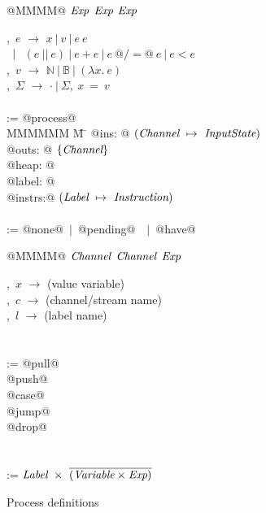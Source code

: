 
\begin{figure}
\begin{minipage}[t]{0.4\textwidth}
\begin{tabbing}
\Instr \TABDEF @MMMM@  \TABSKIP $\textit{Exp}$ \TABSKIP $\textit{Exp}$ \TABSKIP $\textit{Exp}$ \kill

\Exp,~$e$ \> $\to$ \> $x~|~v~|~e~e $ \\
  \> $\enskip|~$ \> $ (e~||~e) ~|~ e+e ~|~ e~@/=@~e ~|~ e < e$ \\
\Value,~$v$ \> $\to$ \> $\mathbb{N}~|~\mathbb{B}~|~(\lambda{}x.~e)$ \\
\Heap,~$\Sigma$ \> $\to$ \> $\cdot~|~\Sigma,~x~=~v$ \\
\\

\Proc \>:=\> @process@ \\
MMMMMM \= M \= \kill
\> \> @ins:   @  $(\textit{Channel} ~\mapsto~ \textit{InputState})$ \\
\> \> @outs:  @  $\{ \textit{Channel} \}$ \\
\> \> @heap:  @  \Heap \\
\> \> @label: @  \Label \\
\> \> @instrs:@  $(\textit{Label} ~\mapsto~ \textit{Instruction})$ \\
\\
\Instr \TABDEF \kill
\InputState \> := \> @none@~$|$~@pending@~\Value~$|$~@have@

\end{tabbing}
\end{minipage}
\begin{minipage}[t]{0.05\textwidth}
\quad
\end{minipage}
\begin{minipage}[t]{0.4\textwidth}
\begin{tabbing}
\Instr \TABDEF @MMMM@  \TABSKIP $\textit{Channel}$ \TABSKIP $\textit{Channel}$ \TABSKIP $\textit{Exp}$ \kill

\Var,~$x$ \> $\to$ \> (value variable) \\
\Chan,~$c$ \> $\to$ \> (channel/stream name) \\
\Label,~$l$ \> $\to$ \> (label name) \\
\\
\\

\Instr
    \> :=\> @pull@  \> \Chan  \> \Var  \> \Next \\
    \TABALT @push@  \> \Chan  \> \Exp  \> \Next \\
    \TABALT @case@  \> \Exp   \> \Next \> \Next \\
    \TABALT @jump@  \>        \>       \> \Next \\
    \TABALT @drop@  \> \Chan  \>       \> \Next \\
\\
\\
\Next \> := \> $\textit{Label}~\times~\overline{(\textit{Variable} \times \textit{Exp})}$ \\
\end{tabbing}
\end{minipage}
\caption{Process definitions}
\label{fig:Process:Def}
\end{figure}

